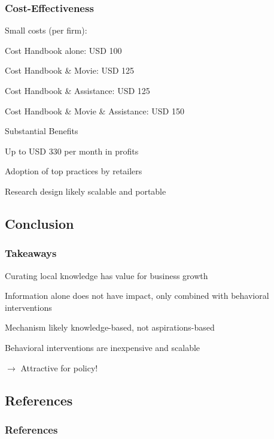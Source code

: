 \documentclass[hideothersubsections, usenames,dvipsnames,10pt]{beamer}
\newenvironment{itemize_3pt}{\itemize\addtolength{\itemsep}{3pt}}{\enditemize}
\begin{document}
\begin{frame}
\frametitle{Cost-Effectiveness}

\textcolor{bdf}{Small costs (per firm)}:
\begin{itemize_3pt}
\item Cost Handbook alone: USD 100
\item Cost Handbook \& Movie: USD 125
\item Cost Handbook \& Assistance: USD 125
\item Cost Handbook \& Movie \& Assistance: USD 150
\end{itemize_3pt}
\vspace{0.5em}

\textcolor{bdf}{Substantial Benefits}
\begin{itemize_3pt}
\item Up to USD 330 per month in profits
\item Adoption of top practices by retailers
\end{itemize_3pt}

\vspace{0.5em}
Research design likely \textcolor{bdf}{scalable and portable}

\end{frame}

\subsection{Conclusion}
\begin{frame}
\frametitle{Takeaways}
\begin{itemize_3pt}
    \item \textcolor{bdf}{Curating local knowledge has value for business growth} 
    \item Information alone does not have impact, only combined with \textcolor{bdf}{behavioral interventions}
    \item Mechanism likely \textcolor{bdf}{knowledge-based}, not aspirations-based
	\item Behavioral interventions are \textcolor{bdf}{inexpensive and scalable}
	\vspace{-0.5em}
	\item[] $\rightarrow$  Attractive for policy!
    
\end{itemize_3pt}
\end{frame}



\subsection{References}
\begin{frame}[allowframebreaks]
\frametitle{References}



\end{frame}
\end{document}
